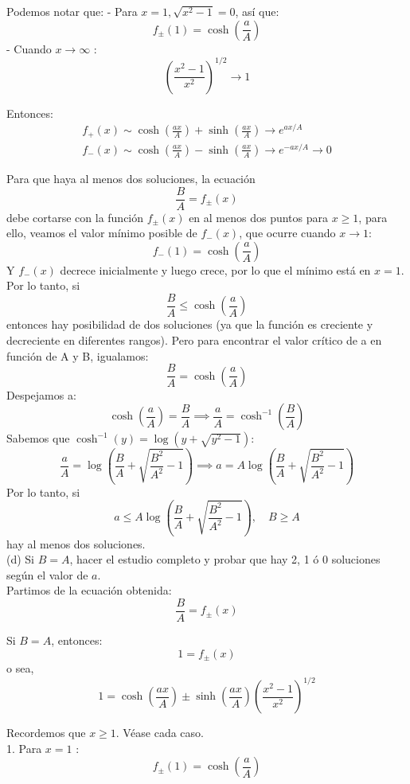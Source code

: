 \documentclass{article}
\theoremstyle{nonumberplain}
\begin{document}
Podemos notar que:
- Para \( x=1, \sqrt{x^{2}-1}=0 \), así que:
\[
f_{ \pm}(1)=\cosh \left(\frac{a}{A}\right)
\]
- Cuando \( x \rightarrow \infty \) :
\[
\left(\frac{x^{2}-1}{x^{2}}\right)^{1 / 2} \rightarrow 1
\]

Entonces:
\[
\begin{array}{c}
f_{+}(x) \sim \cosh \left(\frac{a x}{A}\right)+\sinh \left(\frac{a x}{A}\right) \rightarrow e^{a x / A} \\
f_{-}(x) \sim \cosh \left(\frac{a x}{A}\right)-\sinh \left(\frac{a x}{A}\right) \rightarrow e^{-a x / A} \rightarrow 0
\end{array}
\]

Para que haya al menos dos soluciones, la ecuación
\[
\frac{B}{A} = f_{\pm}(x)
\]
debe cortarse con la función \( f_{\pm}(x) \) en al menos dos puntos para \( x \geq 1 \), para ello, veamos el valor mínimo posible de \( f_{-}(x) \), que ocurre cuando \( x \to 1 \):
\[
f_{-}(1) = \cosh\left(\frac{a}{A}\right)
\]
Y \( f_{-}(x) \) decrece inicialmente y luego crece, por lo que el mínimo está en \( x = 1 \).
Por lo tanto, si
\[
\frac{B}{A} \leq \cosh\left(\frac{a}{A}\right)
\]
entonces hay posibilidad de dos soluciones (ya que la función es creciente y decreciente en diferentes rangos).
Pero para encontrar el valor crítico de a en función de A y B, igualamos:
\[
\frac{B}{A} = \cosh\left(\frac{a}{A}\right)
\]
Despejamos a:
\[
\cosh\left(\frac{a}{A}\right) = \frac{B}{A}
\implies
\frac{a}{A} = \cosh^{-1}\left(\frac{B}{A}\right)
\]
Sabemos que \(\cosh^{-1}(y) = \log(y + \sqrt{y^2 - 1})\):
\[
\frac{a}{A} = \log\left(\frac{B}{A} + \sqrt{\frac{B^2}{A^2} - 1}\right)
\implies
a = A \log\left(\frac{B}{A} + \sqrt{\frac{B^2}{A^2} - 1}\right)
\]
Por lo tanto, si
\[
a \leq A \log\left(\frac{B}{A} + \sqrt{\frac{B^2}{A^2} - 1}\right), \quad B \geq A
\]
hay al menos dos soluciones.\\

(d) Si \( B=A \), hacer el estudio completo y probar que hay 2, 1 ó 0 soluciones según el valor de \( a \). \\

Partimos de la ecuación obtenida:
\[
\frac{B}{A}=f_{ \pm}(x)
\]

Si \( B=A \), entonces:
\[
1=f_{ \pm}(x)
\]
o sea,
\[
1=\cosh \left(\frac{a x}{A}\right) \pm \sinh \left(\frac{a x}{A}\right)\left(\frac{x^{2}-1}{x^{2}}\right)^{1 / 2}
\]

Recordemos que \( x \geq 1 \). Véase cada caso.\\
1. Para \( x=1 \) :
\[
f_{ \pm}(1)=\cosh \left(\frac{a}{A}\right)
\]
\end{document}
